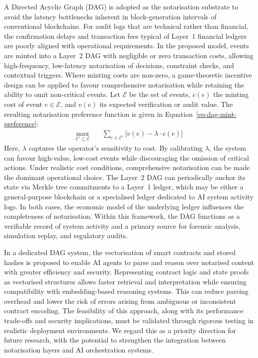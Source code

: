 \documentclass[oneside,10pt]{swissi}
\begin{document}
A Directed Acyclic Graph (DAG) is adopted as the notarisation substrate to avoid the latency bottlenecks inherent in block-generation intervals of conventional blockchains. For audit logs that are technical rather than financial, the confirmation delays and transaction fees typical of Layer~1 financial ledgers are poorly aligned with operational requirements. In the proposed model, events are minted into a Layer~2 DAG with negligible or zero transaction costs, allowing high-frequency, low-latency notarisation of decisions, constraint checks, and contextual triggers. Where minting costs are non-zero, a game-theoretic incentive design can be applied to favour comprehensive notarisation while retaining the ability to omit non-critical events. Let $\mathcal{E}$ be the set of events, $c(e)$ the minting cost of event $e \in \mathcal{E}$, and $v(e)$ its expected verification or audit value. The resulting notarisation preference function is given in Equation~\eqref{eq:dag-mint-preference}:
\begin{align}
\max_{\mathcal{E}' \subseteq \mathcal{E}} \quad & \sum_{e \in \mathcal{E}'} \big[ v(e) - \lambda \cdot c(e) \big]
\label{eq:dag-mint-preference}
\end{align}
Here, $\lambda$ captures the operator’s sensitivity to cost. By calibrating $\lambda$, the system can favour high-value, low-cost events while discouraging the omission of critical actions. Under realistic cost conditions, comprehensive notarisation can be made the dominant operational choice. The Layer~2 DAG can periodically anchor its state via Merkle tree commitments to a Layer~1 ledger, which may be either a general-purpose blockchain or a specialised ledger dedicated to AI system activity logs. In both cases, the economic model of the underlying ledger influences the completeness of notarisation. Within this framework, the DAG functions as a verifiable record of system activity and a primary source for forensic analysis, simulation replay, and regulatory audits.

In a dedicated DAG system, the vectorisation of smart contracts and stored hashes is proposed to enable AI agents to parse and reason over notarised content with greater efficiency and security. Representing contract logic and state proofs as vectorised structures allows faster retrieval and interpretation while ensuring compatibility with embedding-based reasoning systems. This can reduce parsing overhead and lower the risk of errors arising from ambiguous or inconsistent contract encoding. The feasibility of this approach, along with its performance trade-offs and security implications, must be validated through rigorous testing in realistic deployment environments. We regard this as a priority direction for future research, with the potential to strengthen the integration between notarisation layers and AI orchestration systems.
\end{document}
